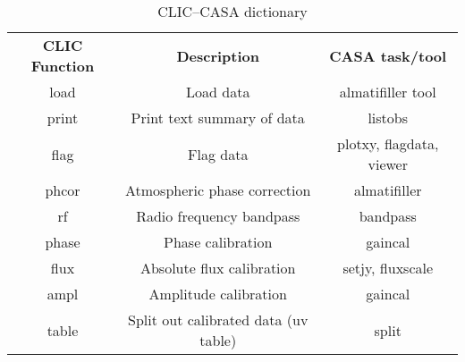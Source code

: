 \vspace{5mm}
\begin{table}[hb]
\caption[CLIC--CASA dictionary]
        {\label{table:clic} CLIC--CASA dictionary}
\begin{center}
\begin{tabular}{|c|c|c|} \hline
{\bf CLIC Function}  & {\bf Description}           &   {\bf CASA task/tool}  \\
  load              & Load data                    &  almatifiller tool \\
  print             & Print text summary of data   &  listobs \\ 
  flag              & Flag data                    &  plotxy, flagdata, viewer \\
  phcor             & Atmospheric phase correction &  almatifiller \\  
  rf                & Radio frequency bandpass     &  bandpass \\
  phase             & Phase calibration            &  gaincal \\
  flux              & Absolute flux calibration    &  setjy, fluxscale \\
  ampl              & Amplitude calibration        &  gaincal \\
  table             & Split out calibrated data (uv table)  &   split \\
\hline
\end{tabular}
\end{center}
\end{table}

